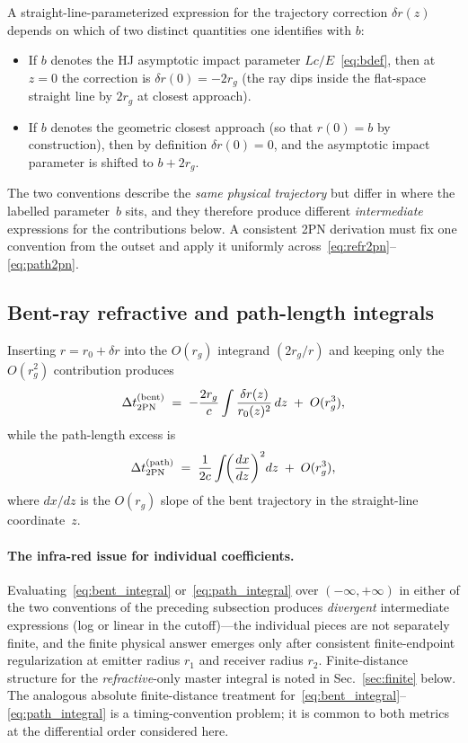 \documentclass[11pt]{article}
\begin{document}
A straight-line-parameterized expression for the trajectory
correction $\delta r(z)$ depends on which of two distinct
quantities one identifies with $b$:
\begin{itemize}
\item If $b$ denotes the HJ asymptotic impact parameter
$Lc/E$~\eqref{eq:bdef}, then at $z=0$ the correction is
$\delta r(0)=-2r_g$ (the ray dips inside the flat-space straight
line by $2r_g$ at closest approach).
\item If $b$ denotes the geometric closest approach (so that
$r(0)=b$ by construction), then by definition $\delta r(0)=0$,
and the asymptotic impact parameter is shifted to $b+2r_g$.
\end{itemize}
The two conventions describe the \emph{same physical
trajectory} but differ in where the labelled parameter~$b$
sits, and they therefore produce different \emph{intermediate}
expressions for the contributions below.  A consistent 2PN
derivation must fix one convention from the outset and apply
it uniformly across~\eqref{eq:refr2pn}--\eqref{eq:path2pn}.

\subsection{Bent-ray refractive and path-length integrals}

Inserting $r=r_0+\delta r$ into the $O(r_g)$ integrand
$(2r_g/r)$ and keeping only the $O(r_g^2)$ contribution
produces
\begin{equation}
\Delta t_{2{\rm PN}}^{\rm (bent)}
\;=\;-\frac{2r_g}{c}\int \frac{\delta r(z)}{r_0(z)^2}\,dz
\;+\;O(r_g^3),
\label{eq:bent_integral}
\end{equation}
while the path-length excess is
\begin{equation}
\Delta t_{2{\rm PN}}^{\rm (path)}
\;=\;\frac{1}{2c}\int\!\!\left(\frac{dx}{dz}\right)^{2}\!dz
\;+\;O(r_g^3),
\label{eq:path_integral}
\end{equation}
where $dx/dz$ is the $O(r_g)$ slope of the bent trajectory in
the straight-line coordinate~$z$.

\paragraph{The infra-red issue for individual coefficients.}
Evaluating~\eqref{eq:bent_integral} or~\eqref{eq:path_integral}
over $(-\infty,+\infty)$ in either of the two conventions of
the preceding subsection produces \emph{divergent}
intermediate expressions (log or linear in the cutoff)---the
individual pieces are not separately finite, and the finite
physical answer emerges only after consistent finite-endpoint
regularization at emitter radius $r_1$ and receiver radius
$r_2$.  Finite-distance structure for the
\emph{refractive}-only master integral is noted in
Sec.~\ref{sec:finite} below.  The analogous absolute
finite-distance treatment for~\eqref{eq:bent_integral}--\eqref{eq:path_integral}
is a timing-convention problem; it is common to both metrics
at the differential order considered here.
\end{document}

